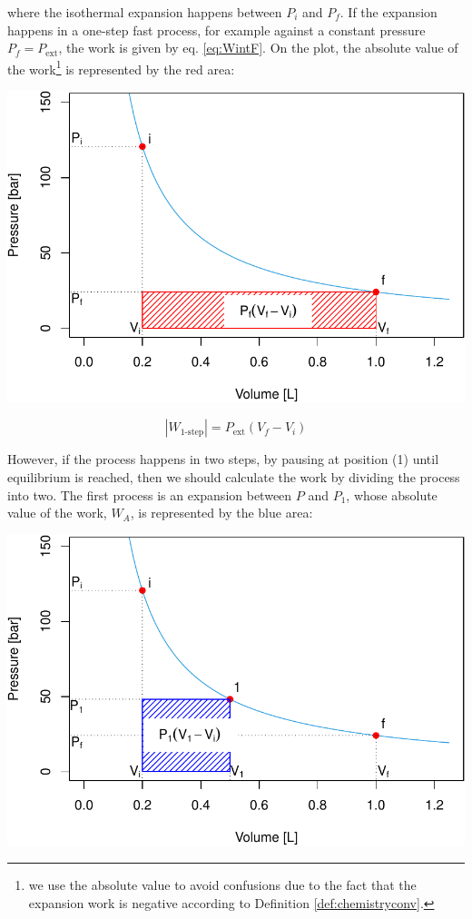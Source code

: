 \documentclass[
  9pt,
]{extbook}
\theoremstyle{definition}
\theoremstyle{definition}
\theoremstyle{definition}
\theoremstyle{remark}
\begin{document}
where the isothermal expansion happens between \(P_i\) and \(P_f\). If the expansion happens in a one-step fast process, for example against a constant pressure \(P_f=P_{\text{ext}}\), the work is given by eq. \eqref{eq:WintF}. On the plot, the absolute value of the work\footnote{we use the absolute value to avoid confusions due to the fact that the expansion work is negative according to Definition \ref{def:chemistryconv}.} is represented by the red area:

\begin{center}\includegraphics[width=0.7\linewidth]{pchem1_files/figure-latex/unnamed-chunk-3-1} \end{center}

\begin{equation}
\left| W_{\text{1-step}} \right| = P_{\text{ext}} (V_f-V_i)
  \label{eq:Warea1}
\end{equation}

However, if the process happens in two steps, by pausing at position (1) until equilibrium is reached, then we should calculate the work by dividing the process into two. The first process is an expansion between \(P\) and \(P_1\), whose absolute value of the work, \(W_A\), is represented by the blue area:

\begin{center}\includegraphics[width=0.7\linewidth]{pchem1_files/figure-latex/unnamed-chunk-4-1} \end{center}
\end{document}
